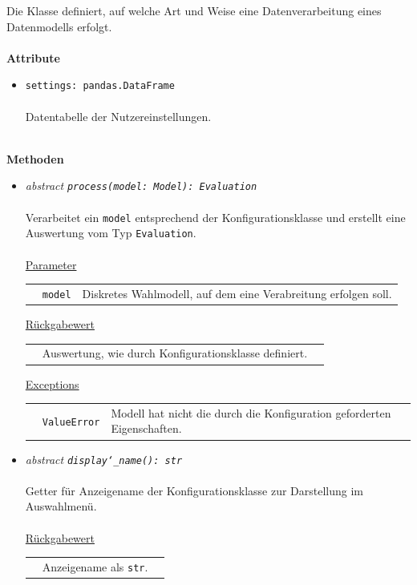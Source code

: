 \documentclass{article}
\begin{document}
Die Klasse definiert, auf welche Art und Weise eine Datenverarbeitung eines Datenmodells erfolgt.
\\\\

\textbf{Attribute}
\begin{itemize}\setlength\itemsep{3em}
\item \texttt{settings: pandas.DataFrame}\\\\
Datentabelle der Nutzereinstellungen.
\\\\
\end{itemize}

\textbf{Methoden}
\begin{itemize}\setlength\itemsep{3em}
\item \textit{\flqq{}abstract\frqq} \texttt{\textit{process(model: Model): Evaluation}}\\\\
Verarbeitet ein \texttt{model} entsprechend der Konfigurationsklasse und erstellt eine Auswertung vom Typ \texttt{Evaluation}.
\\\\
\underline{Parameter}\\
\begin{tabular}{lll}
 & \texttt{model} & Diskretes Wahlmodell, auf dem eine Verabreitung erfolgen soll.\\
\end{tabular}

\underline{Rückgabewert}\\
\begin{tabular}{lll}
 & Auswertung, wie durch Konfigurationsklasse definiert.\\
\end{tabular}

\underline{Exceptions}\\
\begin{tabular}{lll}
 & \texttt{ValueError} & Modell hat nicht die durch die Konfiguration geforderten Eigenschaften.\\
\end{tabular}

\item \textit{\flqq{}abstract\frqq} \texttt{\textit{display\char`_name(): str}}\\\\
Getter für Anzeigename der Konfigurationsklasse zur Darstellung im Auswahlmenü.
\\\\
\underline{Rückgabewert}\\
\begin{tabular}{lll}
 & Anzeigename als \texttt{str}.\\
\end{tabular}


\end{itemize}
\end{document}
